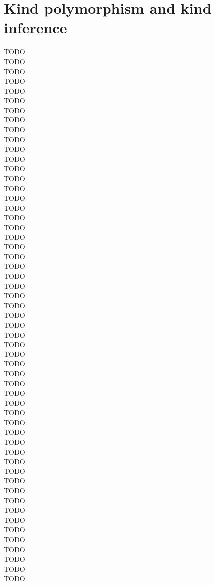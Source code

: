 \section{Kind polymorphism and kind inference}\label{sec:futwork:kindpoly}
TODO \\
TODO \\ TODO \\ TODO \\ TODO \\ TODO \\ TODO \\ TODO \\ TODO \\ TODO \\ 
TODO \\ TODO \\ TODO \\ TODO \\ TODO \\ TODO \\ TODO \\ TODO \\ TODO \\ 
TODO \\ TODO \\ TODO \\ TODO \\ TODO \\ TODO \\ TODO \\ TODO \\ TODO \\ 
TODO \\ TODO \\ TODO \\ TODO \\ TODO \\ TODO \\ TODO \\ TODO \\ TODO \\ 
TODO \\ TODO \\ TODO \\ TODO \\ TODO \\ TODO \\ TODO \\ TODO \\ TODO \\ 
TODO \\ TODO \\ TODO \\ TODO \\ TODO \\ TODO \\ TODO \\ TODO \\ TODO \\ 

